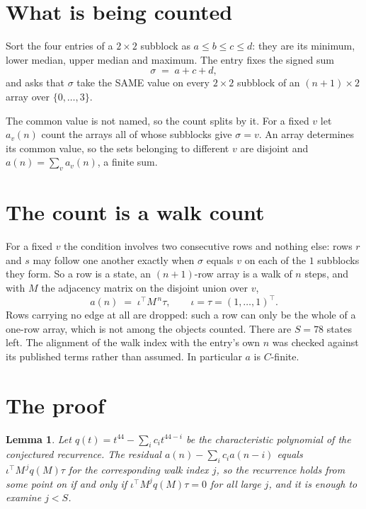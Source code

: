 \documentclass[11pt,a4paper]{article}
\theoremstyle{plain}
\newtheorem{lemma}[theorem]{Lemma}
\theoremstyle{definition}
\begin{document}
\section{What is being counted}

Sort the four entries of a $2\times2$ subblock as $a\le b\le c\le d$: they
are its minimum, lower median, upper median and maximum. The entry fixes the signed sum
\[
\sigma\;=\;a+c+d,
\]
and asks that $\sigma$ take the SAME value on every $2\times2$ subblock of an
$(n+1)\times2$ array over $\{0,\dots,3\}$.

The common value is not named, so the count splits by it. For a fixed $v$ let $a_v(n)$ count
the arrays all of whose subblocks give $\sigma=v$. An array determines its common value, so
the sets belonging to different $v$ are disjoint and $a(n)=\sum_v a_v(n)$, a finite sum.


\section{The count is a walk count}

For a fixed $v$ the condition involves two consecutive rows and nothing
else: rows $r$ and $s$ may follow one another exactly when $\sigma$ equals $v$ on each of the
$1$ subblocks they form. So a row is a state, an $(n+1)$-row array is a walk of $n$
steps, and with $M$ the adjacency matrix on the disjoint union over $v$,
\[
a(n)\;=\;\iota^{\!\top}M^{\,n}\tau,\qquad\iota=\tau=(1,\dots,1)^{\!\top} .
\]
Rows carrying no edge at all are dropped: such a row can only be the whole of a one-row
array, which is not among the objects counted. There are $S=78$ states left.
The alignment of the walk index with the entry's own $n$ was checked against its published
terms rather than assumed. In particular $a$ is $C$-finite.

\section{The proof}

\begin{lemma}\label{lem:crit}
Let $q(t)=t^{44}-\sum_i c_it^{44-i}$ be the characteristic polynomial of the
conjectured recurrence. The residual $a(n)-\sum_ic_ia(n-i)$ equals
$\iota^{\!\top}M^{\,j}q(M)\tau$ for the corresponding walk index $j$, so the recurrence
holds from some point on if and only if $\iota^{\!\top}M^{j}q(M)\tau=0$ for all large $j$,
and it is enough to examine $j<S$.
\end{lemma}
\end{document}
